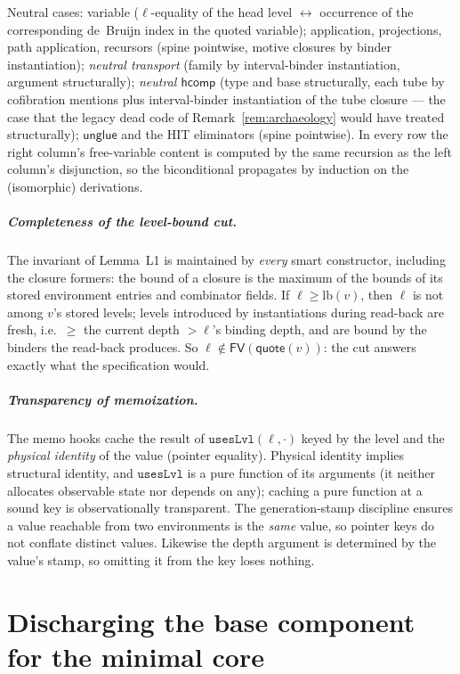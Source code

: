 \documentclass{lmcs}
\newcommand{\hcomp}{\mathsf{hcomp}}
\newcommand{\unglue}{\mathsf{unglue}}
\newcommand{\FV}{\mathsf{FV}}
\newcommand{\quo}{\mathsf{quote}}
\begin{document}
Neutral cases: variable ($\ell$-equality of the head level
$\leftrightarrow$ occurrence of the corresponding de~Bruijn index in
the quoted variable); application, projections, path application,
recursors (spine pointwise, motive closures by binder
instantiation); \emph{neutral transport} (family by interval-binder
instantiation, argument structurally); \emph{neutral $\hcomp$} (type
and base structurally, each tube by cofibration mentions plus
interval-binder instantiation of the tube closure --- the case that
the legacy dead code of Remark~\ref{rem:archaeology} would have
treated structurally); $\unglue$ and the HIT eliminators (spine
pointwise).  In every row the right column's free-variable content
is computed by the same recursion as the left column's disjunction,
so the biconditional propagates by induction on the (isomorphic)
derivations.

\subparagraph*{Completeness of the level-bound cut.}  The invariant
of Lemma~L1 is maintained by \emph{every} smart constructor,
including the closure formers: the bound of a closure is the maximum
of the bounds of its stored environment entries and combinator
fields.  If $\ell \ge \mathrm{lb}(v)$, then $\ell$ is not among
$v$'s stored levels; levels introduced by instantiations during
read-back are fresh, i.e.\ $\ge$ the current depth $> \ell$'s
binding depth, and are bound by the binders the read-back produces.
So $\ell \notin \FV(\quo(v))$: the cut answers exactly what the
specification would.

\subparagraph*{Transparency of memoization.}  The memo hooks cache
the result of $\texttt{usesLvl}(\ell, \cdot)$ keyed by the level and
the \emph{physical identity} of the value (pointer equality).
Physical identity implies structural identity, and
$\texttt{usesLvl}$ is a pure function of its arguments (it neither
allocates observable state nor depends on any); caching a pure
function at a sound key is observationally transparent.  The
generation-stamp discipline ensures a value reachable from two
environments is the \emph{same} value, so pointer keys do not
conflate distinct values.  Likewise the depth argument is determined
by the value's stamp, so omitting it from the key loses nothing.

\section{Discharging the base component for the minimal core}
\label{app:core}
\end{document}

